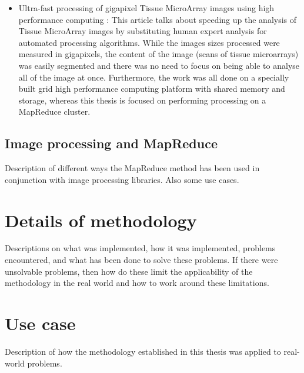 \documentclass [12pt,a4paper]{report}
\begin{document}
\begin{itemize}
	\item Ultra-fast processing of gigapixel Tissue MicroArray images using high performance computing \cite{wang2011ult}: This article talks about speeding up the analysis of Tissue MicroArray images by substituting human expert analysis for automated processing algorithms. While the images sizes processed were measured in gigapixels, the content of the image (scans of tissue microarrays) was easily segmented and there was no need to focus on being able to analyse all of the image at once. Furthermore, the work was all done on a specially built grid high performance computing platform with shared memory and storage, whereas this thesis is focused on performing processing on a MapReduce cluster.
\end{itemize}

\section{Image processing and MapReduce}
Description of different ways the MapReduce method has been used in conjunction with image processing libraries. Also some use cases.

\chapter{Details of methodology}
Descriptions on what was implemented, how it was implemented, problems encountered, and what has been done to solve these problems. If there were unsolvable problems, then how do these limit the applicability of the methodology in the real world and how to work around these limitations.

\chapter{Use case}
Description of how the methodology established in this thesis was applied to real-world problems.


\clearpage
{}


\end{document}
